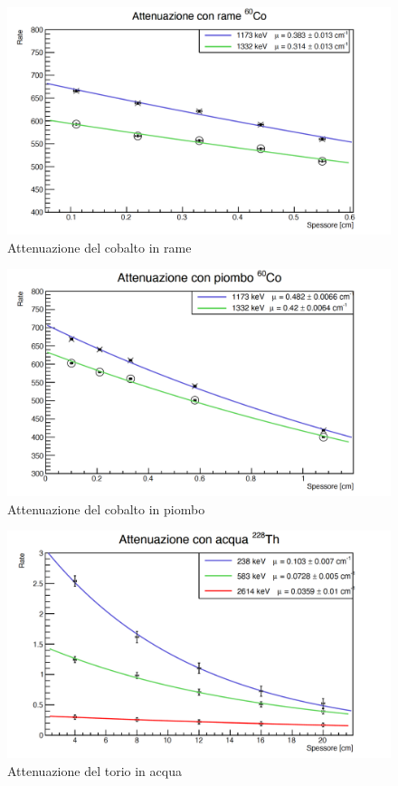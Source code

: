 \documentclass[a4paper,10pt]{article}
\begin{document}
\begin{figure}[H]
    \centering
    \includegraphics[scale=0.45]{grafici/attenuazionecobaltorame}
    \caption{Attenuazione del cobalto in rame}
\end{figure}

\begin{figure}[H]
    \centering
    \includegraphics[scale=0.45]{grafici/attenuazionecobaltopiombo}
    \caption{Attenuazione del cobalto in piombo}
\end{figure}

\begin{figure}[H]
    \centering
    \includegraphics[scale=0.45]{grafici/attenuazionetorioacqua}
    \caption{Attenuazione del torio in acqua}
\end{figure}
\end{document}
